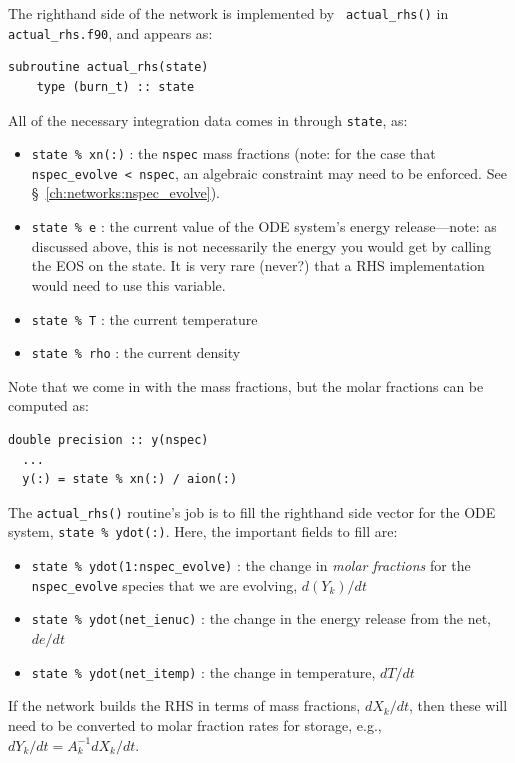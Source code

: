 The righthand side of the network is implemented by {\tt
  actual\_rhs()} in {\tt actual\_rhs.f90}, and appears as:
\begin{lstlisting}[language={[95]fortran}]
  subroutine actual_rhs(state)
    type (burn_t) :: state
\end{lstlisting}

All of the necessary integration data comes in through {\tt state}, as:
\begin{itemize}
\item {\tt state \% xn(:)} : the {\tt nspec} mass fractions (note: for
  the case that {\tt nspec\_evolve < nspec}, an algebraic constraint
  may need to be enforced.  See \S~\ref{ch:networks:nspec_evolve}).

\item {\tt state \% e} : the current value of the ODE system's energy 
  release---note: as discussed above, this is not necessarily the energy
  you would get by calling the EOS on the state.  It is very rare (never?)
  that a RHS implementation would need to use this variable.

\item {\tt state \% T} : the current temperature

\item {\tt state \% rho} : the current density
\end{itemize}
Note that we come in with the mass fractions, but the molar fractions can
be computed as:
\begin{lstlisting}[language={[95]fortran}]
  double precision :: y(nspec)
  ...
  y(:) = state % xn(:) / aion(:)
\end{lstlisting}

The {\tt actual\_rhs()} routine's job is to fill the righthand side vector
for the ODE system, {\tt state \% ydot(:)}.  Here, the important
fields to fill are:
\begin{itemize}
\item {\tt state \% ydot(1:nspec\_evolve)} : the change in {\em molar
  fractions} for the {\tt nspec\_evolve} species that we are evolving,
  $d({Y}_k)/dt$

\item {\tt state \% ydot(net\_ienuc)} : the change in the energy release 
  from the net, $de/dt$

\item {\tt state \% ydot(net\_itemp)} : the change in temperature, $dT/dt$
\end{itemize}

If the network builds the RHS in terms of mass fractions, $dX_k/dt$, then 
these will need to be converted to molar fraction rates for storage, e.g.,
$dY_k/dt = A_k^{-1} dX_k/dt$.


